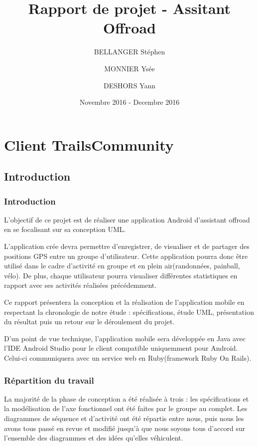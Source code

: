 \documentclass[titlepage]{report}
\title{Rapport de projet - Assitant Offroad}
\author{BELLANGER Stéphen \and
			MONNIER Ysée \and
			DESHORS Yann}
\date{Novembre 2016 - Decembre 2016}
\begin{document}
	
\maketitle

\tableofcontents

\listoffigures 

\part{Client TrailsCommunity}

\chapter{Introduction}

\section{Introduction}
\par
L'objectif de ce projet est de réaliser une application Android d'assistant offroad en se focalisant sur sa conception UML. 

\par
L'application crée devra permettre d'enregistrer, de visualiser et de partager des positions GPS entre un groupe d'utilisateur. Cette application pourra donc être utilisé dans le cadre d'activité en groupe et en plein air(randonnées, painball, vélo). De plus, chaque utilisateur pourra visualiser différentes statistiques en rapport avec ses activités réalisées précédemment.
\par
Ce rapport présentera la conception et la réalisation de l'application mobile en respectant la chronologie de notre étude : spécifications, étude UML, présentation du résultat puis un retour sur le déroulement du projet.
\par D'un point de vue technique, l'application mobile sera développée en Java avec l'IDE Android Studio pour le client compatible uniquemment pour Android. Celui-ci communiquera avec un service web en Ruby(framework Ruby On Rails).

\section{Répartition du travail}

\par La majorité de la phase de conception a été réalisée à trois : les spécifications et la modélisation de l'axe fonctionnel ont été faites par le groupe au complet.
Les diagrammes de séquence et d'activité ont été répartis entre nous, puis nous les avons tous passé en revue et modifié jusqu'à que nous soyons tous d'accord sur l'ensemble des diagrammes et des idées qu'elles véhiculent.
\end{document}
